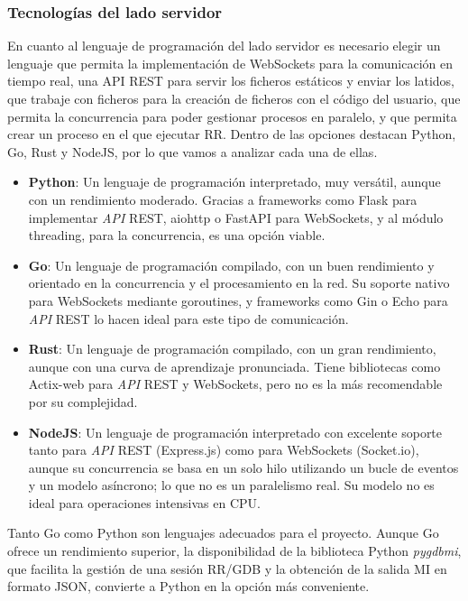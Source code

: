 \subsubsection{Tecnologías del lado servidor} \label{sec:tecnologias-servidor}

En cuanto al lenguaje de programación del lado servidor es necesario elegir un lenguaje que permita la implementación de WebSockets para la comunicación en tiempo real, una API REST para servir los ficheros estáticos y enviar los latidos, que trabaje con ficheros para la creación de ficheros con el código del usuario, que permita la concurrencia para poder gestionar \glspl{proceso} en paralelo, y que permita crear un \gls{proceso} en el que ejecutar RR.
Dentro de las opciones destacan Python, Go, Rust y NodeJS, por lo que vamos a analizar cada una de ellas.

\begin{itemize}
    \item \textbf{Python}: Un lenguaje de programación interpretado, muy versátil, aunque con un rendimiento moderado. Gracias a frameworks como Flask para implementar \textit{API} REST, aiohttp o FastAPI para WebSockets, y al módulo threading, para la concurrencia, es una opción viable.
    \item \textbf{Go}: Un lenguaje de programación compilado, con un buen rendimiento y orientado en la concurrencia y el procesamiento en la red. Su soporte nativo para WebSockets mediante goroutines, y frameworks como Gin o Echo para \textit{API} REST lo hacen ideal para este tipo de comunicación.
    \item \textbf{Rust}: Un lenguaje de programación compilado, con un gran rendimiento, aunque con una curva de aprendizaje pronunciada. Tiene bibliotecas como Actix-web para \textit{API} REST y WebSockets, pero no es la más recomendable por su complejidad.
    \item \textbf{NodeJS}: Un lenguaje de programación interpretado con excelente soporte tanto para \textit{API} REST (Express.js) como para WebSockets (Socket.io), aunque su concurrencia se basa en un solo hilo utilizando un bucle de eventos y un modelo asíncrono; lo que no es un paralelismo real. Su modelo no es ideal para operaciones intensivas en CPU.
\end{itemize}

Tanto Go como Python son lenguajes adecuados para el proyecto. Aunque Go ofrece un rendimiento superior, la disponibilidad de la biblioteca Python \textit{pygdbmi}, que facilita la gestión de una sesión RR/GDB y la obtención de la salida MI en formato JSON, convierte a Python en la opción más conveniente.

